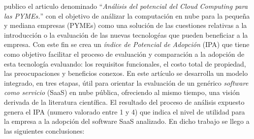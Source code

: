 \cite{ercolani} publico el articulo denominado ``\emph{Análisis del potencial del
Cloud Computing para las PYMEs.}'' con el objetivo de análizar la computación en nube
para la pequeña y mediana empresas (PYMEs) como una solución de las cuestiones relativas a la
introducción o la evaluación de las nuevas tecnologéas que pueden beneficiar a la empresa.
Con este fin se crea un \emph{índice de Potencial de Adopción} (IPA) que tiene
como objetivo facilitar el proceso de evaluación y comparación a la adopción de
esta tecnología evaluando: los requisitos funcionales, el costo total de propiedad,
las preocupaciones y beneficios conexos.
En este artículo se desarrolla un modelo integrado, en tres etapas, útil para
orientar la evaluación de un genérico \emph{software como servicio} (SaaS) en nube
pública, ofreciendo al mismo tiempo, una visión derivada de la literatura científica.
El resultado del proceso de análisis expuesto genera el IPA (numero valorado
entre 1 y 4) que indica el nivel de utilidad para la empresa a la adopción del
software SaaS analizado. En dicho trabajo se llego a las siguientes conclusiones:
